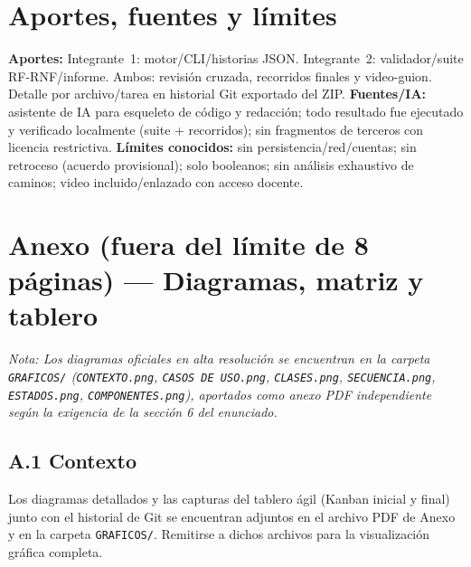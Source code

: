 \documentclass[11pt,a4paper]{article}
\begin{document}
\section{Aportes, fuentes y l\'imites}
\textbf{Aportes:} Integrante~1: motor/CLI/historias JSON. Integrante~2: validador/suite RF-RNF/informe. Ambos: revisi\'on cruzada, recorridos finales y video-guion. Detalle por archivo/tarea en historial Git exportado del ZIP. \textbf{Fuentes/IA:} asistente de IA para esqueleto de c\'odigo y redacci\'on; todo resultado fue ejecutado y verificado localmente (suite + recorridos); sin fragmentos de terceros con licencia restrictiva. \textbf{L\'imites conocidos:} sin persistencia/red/cuentas; sin retroceso (acuerdo provisional); solo booleanos; sin an\'alisis exhaustivo de caminos; video incluido/enlazado con acceso docente.

\appendix
\section*{Anexo (fuera del l\'imite de 8 p\'aginas) --- Diagramas, matriz y tablero}
\noindent\textit{Nota: Los diagramas oficiales en alta resoluci\'on se encuentran en la carpeta \texttt{GRAFICOS/} (\texttt{CONTEXTO.png}, \texttt{CASOS DE USO.png}, \texttt{CLASES.png}, \texttt{SECUENCIA.png}, \texttt{ESTADOS.png}, \texttt{COMPONENTES.png}), aportados como anexo PDF independiente seg\'un la exigencia de la secci\'on 6 del enunciado.}

\subsection*{A.1 Contexto}
Los diagramas detallados y las capturas del tablero \'agil (Kanban inicial y final) junto con el historial de Git se encuentran adjuntos en el archivo PDF de Anexo y en la carpeta \texttt{GRAFICOS/}. Remitirse a dichos archivos para la visualizaci\'on gr\'afica completa.
\end{document}
